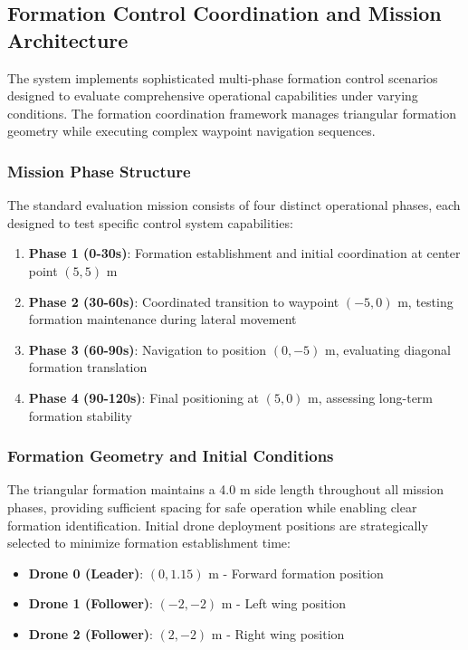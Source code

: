 \subsection*{Formation Control Coordination and Mission Architecture}

The system implements sophisticated multi-phase formation control scenarios designed to evaluate comprehensive operational capabilities under varying conditions. The formation coordination framework manages triangular formation geometry while executing complex waypoint navigation sequences.

\subsubsection*{Mission Phase Structure}

The standard evaluation mission consists of four distinct operational phases, each designed to test specific control system capabilities:

\begin{enumerate}
    \item \textbf{Phase 1 (0-30s)}: Formation establishment and initial coordination at center point $(5, 5)$ m
    \item \textbf{Phase 2 (30-60s)}: Coordinated transition to waypoint $(-5, 0)$ m, testing formation maintenance during lateral movement
    \item \textbf{Phase 3 (60-90s)}: Navigation to position $(0, -5)$ m, evaluating diagonal formation translation
    \item \textbf{Phase 4 (90-120s)}: Final positioning at $(5, 0)$ m, assessing long-term formation stability
\end{enumerate}

\subsubsection*{Formation Geometry and Initial Conditions}

The triangular formation maintains a 4.0 m side length throughout all mission phases, providing sufficient spacing for safe operation while enabling clear formation identification. Initial drone deployment positions are strategically selected to minimize formation establishment time:

\begin{itemize}
    \item \textbf{Drone 0 (Leader)}: $(0, 1.15)$ m - Forward formation position
    \item \textbf{Drone 1 (Follower)}: $(-2, -2)$ m - Left wing position
    \item \textbf{Drone 2 (Follower)}: $(2, -2)$ m - Right wing position
\end{itemize}

